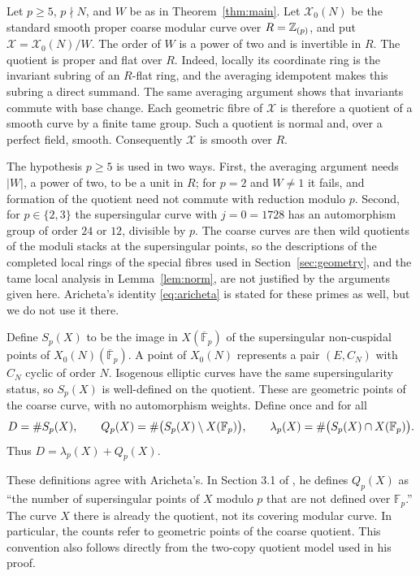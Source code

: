 \documentclass[11pt,a4paper]{article}
\theoremstyle{remark}\newtheorem{remark}[theorem]{Remark}
\numberwithin{equation}{section}
\newcommand{\kk}{\overline{\mathbb F}_p}
\begin{document}
	Let $p\geq5$, $p\nmid N$, and $W$ be as in Theorem~\ref{thm:main}. Let $\mathscr X_0(N)$ be the standard smooth proper coarse modular curve over $R=\mathbb Z_{(p)}$, and put $\mathscr X=\mathscr X_0(N)/W$. The order of $W$ is a power of two and is invertible in $R$. The quotient is proper and flat over $R$. Indeed, locally its coordinate ring is the invariant subring of an $R$-flat ring, and the averaging idempotent makes this subring a direct summand. The same averaging argument shows that invariants commute with base change. Each geometric fibre of $\mathscr X$ is therefore a quotient of a smooth curve by a finite tame group. Such a quotient is normal and, over a perfect field, smooth. Consequently $\mathscr X$ is smooth over $R$.

	The hypothesis $p\geq5$ is used in two ways. First, the averaging argument needs $|W|$, a power of two, to be a unit in $R$; for $p=2$ and $W\neq1$ it fails, and formation of the quotient need not commute with reduction modulo $p$. Second, for $p\in\{2,3\}$ the supersingular curve with $j=0=1728$ has an automorphism group of order $24$ or $12$, divisible by $p$. The coarse curves are then wild quotients of the moduli stacks at the supersingular points, so the descriptions of the completed local rings of the special fibres used in Section~\ref{sec:geometry}, and the tame local analysis in Lemma~\ref{lem:norm}, are not justified by the arguments given here. Aricheta's identity \eqref{eq:aricheta} is stated for these primes as well, but we do not use it there.

	Define $S_p(X)$ to be the image in $X(\kk)$ of the supersingular non-cuspidal points of $X_0(N)(\kk)$. A point of $X_0(N)$ represents a pair $(E,C_N)$ with $C_N$ cyclic of order $N$. Isogenous elliptic curves have the same supersingularity status, so $S_p(X)$ is well-defined on the quotient. These are geometric points of the coarse curve, with no automorphism weights. Define once and for all
	\begin{equation}\label{eq:counts}
		D=\#S_p(X),\qquad
		Q_p(X)=\#\bigl(S_p(X)\setminus X(\mathbb F_p)\bigr),\qquad
		\lambda_p(X)=\#\bigl(S_p(X)\cap X(\mathbb F_p)\bigr).
	\end{equation}
	Thus $D=\lambda_p(X)+Q_p(X)$.
	
	These definitions agree with Aricheta's. In Section 3.1 of \cite{Aricheta}, he defines $Q_p(X)$ as ``the number of supersingular points of $X$ modulo $p$ that are not defined over $\mathbb F_p$.'' The curve $X$ there is already the quotient, not its covering modular curve. In particular, the counts refer to geometric points of the coarse quotient. This convention also follows directly from the two-copy quotient model used in his proof.
	
\end{document}
